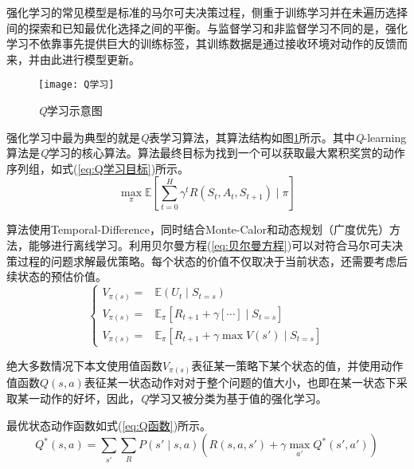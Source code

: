 强化学习的常见模型是标准的马尔可夫决策过程，侧重于训练学习并在未遍历选择间的探索和已知最优化选择之间的平衡。与监督学习和非监督学习不同的是，强化学习不依靠事先提供巨大的训练标签，其训练数据是通过接收环境对动作的反馈而来，并由此进行模型更新。

\begin{figure}[h]
	\centering
	\texttt{[image: Q学习]}
	\caption{\textit{Q}学习示意图}
	\label{fig:Q学习}
\end{figure}

强化学习中最为典型的就是\textit{Q}表学习算法，其算法结构如图\ref{fig:Q学习}所示。其中\textit{Q}-learning算法是\textit{Q}学习的核心算法。算法最终目标为找到一个可以获取最大累积奖赏的动作序列组，如式(\ref{eq:Q学习目标})所示。
\begin{equation}\label{eq:Q学习目标}
\underset{\pi}{\max }\mathbb{E}\left [ \sum_{t=0}^{H}\gamma^{t}R\left ( S_{t},A_{t},S_{t+1} \right )\mid\pi \right ]
\end{equation}

算法使用Temporal-Difference，同时结合Monte-Calor和动态规划（广度优先）方法，能够进行离线学习。利用贝尔曼方程(\ref{eq:贝尔曼方程})可以对符合马尔可夫决策过程的问题求解最优策略。每个状态的价值不仅取决于当前状态，还需要考虑后续状态的预估价值。
\begin{equation}\label{eq:贝尔曼方程}
\left\lbrace 
\begin{aligned}
V_{\pi(s)}=&\mathbb{E}\left ( U_{t}\mid S_{t=s} \right )\\
V_{\pi(s)}=&\mathbb{E}_{\pi}\left [ R_{t+1}+\gamma \left [ \cdots \right ]\mid S_{t=s} \right ]\\
V_{\pi(s)}=&\mathbb{E}_{\pi}\left [ R_{t+1}+\gamma \max V\left ( {s}' \right )\mid S_{t=s} \right ]
\end{aligned}
\right.
\end{equation}

绝大多数情况下本文使用值函数$V_{\pi(s)}$表征某一策略下某个状态的值，并使用动作值函数$Q(s,a)$表征某一状态动作对对于整个问题的值大小，也即在某一状态下采取某一动作的好坏，因此，\textit{Q}学习又被分类为基于值的强化学习。

最优状态动作函数如式(\ref{eq:Q函数})所示。
\begin{equation}\label{eq:Q函数}
Q^{*}\left ( s,a \right )=\sum _{{s}'} \sum _{R}P\left ( {s}'\mid s,a \right )\left ( R\left ( s,a,{s}' \right ) +\gamma\max _{{a}'}Q^{*}\left ( {s}' ,{a}'\right )\right )
\end{equation}


